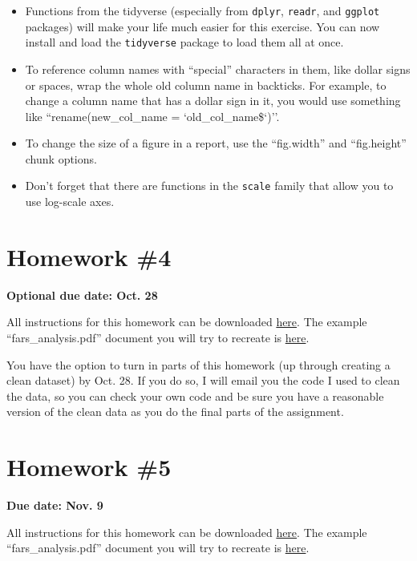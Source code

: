\documentclass[]{book}
\providecommand{\tightlist}{%
  \setlength{\itemsep}{0pt}\setlength{\parskip}{0pt}}
\theoremstyle{definition}
\theoremstyle{definition}
\theoremstyle{definition}
\theoremstyle{remark}
\begin{document}
\begin{itemize}
\tightlist
\item
  Functions from the tidyverse (especially from \texttt{dplyr},
  \texttt{readr}, and \texttt{ggplot} packages) will make your life much
  easier for this exercise. You can now install and load the
  \texttt{tidyverse} package to load them all at once.
\item
  To reference column names with ``special'' characters in them, like
  dollar signs or spaces, wrap the whole old column name in backticks.
  For example, to change a column name that has a dollar sign in it, you
  would use something like ``rename(new\_col\_name =
  `old\_col\_name\$`)''.
\item
  To change the size of a figure in a report, use the ``fig.width'' and
  ``fig.height'' chunk options.
\item
  Don't forget that there are functions in the \texttt{scale} family
  that allow you to use log-scale axes.
\end{itemize}

\section{Homework \#4}\label{homework-4}

\textbf{Optional due date: Oct. 28}

All instructions for this homework can be downloaded
\href{https://github.com/geanders/RProgrammingForResearch/raw/master/Homework/Homework4and5.pdf}{here}.
The example ``fars\_analysis.pdf'' document you will try to recreate is
\href{https://github.com/geanders/RProgrammingForResearch/raw/master/Homework/fars_analysis.pdf}{here}.

You have the option to turn in parts of this homework (up through
creating a clean dataset) by Oct. 28. If you do so, I will email you the
code I used to clean the data, so you can check your own code and be
sure you have a reasonable version of the clean data as you do the final
parts of the assignment.

\section{Homework \#5}\label{homework-5}

\textbf{Due date: Nov. 9}

All instructions for this homework can be downloaded
\href{https://github.com/geanders/RProgrammingForResearch/raw/master/Homework/Homework4and5.pdf}{here}.
The example ``fars\_analysis.pdf'' document you will try to recreate is
\href{https://github.com/geanders/RProgrammingForResearch/raw/master/Homework/fars_analysis.pdf}{here}.
\end{document}
